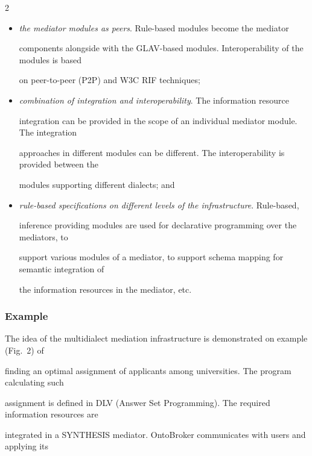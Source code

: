 \begin{multicols}{2}
\begin{itemize}
becomes a multidialect one;


\item \textit{the mediator modules as peers}. Rule-based modules become the mediator 


components alongside with the GLAV-based modules. Interoperability of the modules is based 


on peer-to-peer (P2P) and W3C RIF techniques;


\item \textit{combination of integration and interoperability}. The information resource 


integration can be provided in the scope of an individual mediator module. The integration 


approaches in different modules can be different. The interoperability is provided between the 


modules supporting different dialects; and


\item \textit{rule-based specifications on different levels of the infrastructure}. Rule-based, 


inference providing modules are used for declarative programming over the mediators, to 


support various modules of a mediator, to support schema mapping for semantic integration of 


the information resources in the mediator, etc.


\end{itemize}





\subsubsection{Example}





\noindent


The idea of the multidialect mediation infrastructure is demonstrated on example (Fig.~2) of 


finding an optimal assignment of applicants among universities. The program calculating such 


assignment is defined in DLV (Answer Set Programming). The required information resources are 


integrated in a SYNTHESIS mediator. OntoBroker communicates with users and applying its 



\end{multicols}
